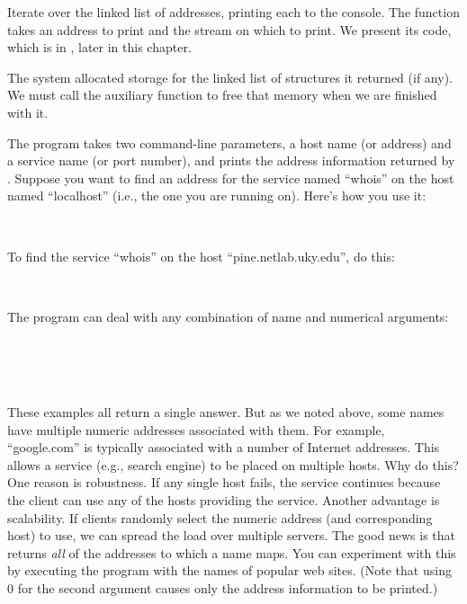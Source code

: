 \begin{topcode}

Iterate over the linked list of addresses, printing each to the console.  
The function
 takes an address to print and the stream
on which to print. We present its code, which is in
, later in this chapter.


The system allocated storage for the linked list of
 structures it returned (if any).
We must call the auxiliary function  to free that
memory when we are finished with it.

\end{topcode}

The program  takes two command-line parameters, a
host name (or address) and a service name (or port number), and prints
the address information returned by .
Suppose you want to find an address for the service named ``whois'' on
the host named ``localhost'' (i.e., the one you are running on).
Here's how you use it:
%
\begin{shell}
\prompt {} \\
\end{shell}
To find the service ``whois'' on the host
``pine.netlab.uky.edu'', do this:

\begin{shell}
\prompt {} \\
\end{shell}
%
The program can deal with any combination of name and numerical
arguments:
\begin{shell}
\prompt {}\\
\\
\prompt {}\\
\end{shell}
These examples all return a single answer.  But as we noted above,
some names have multiple numeric addresses associated with them.
For example, ``google.com'' is typically associated with a number of
Internet addresses.  This allows a service (e.g., search
engine) to be placed on multiple hosts.
Why do this?  One reason is robustness.
If any single host fails, the service continues because the client can
use any of the hosts providing the service.  Another advantage is
scalability.  If clients randomly select the numeric address (and
corresponding host) to use, we can spread the load over multiple
servers.  The good news is that 
returns \emph{all\/} of the addresses
to which a name maps.  You can experiment with this by
executing the program with the names of popular web sites.
(Note that using 0 for the second argument causes only the address
information to be printed.)

